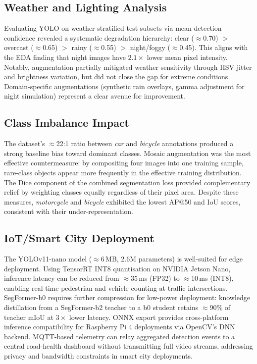 \documentclass[10pt,twocolumn]{article}
\begin{document}
\subsection{Weather and Lighting Analysis}

Evaluating YOLO on weather-stratified test subsets via mean detection
confidence revealed a systematic degradation hierarchy:
clear ($\approx$0.70) $>$ overcast ($\approx$0.65) $>$ rainy ($\approx$0.55)
$>$ night/foggy ($\approx$0.45).  This aligns with the EDA finding that night
images have $2.1\times$ lower mean pixel intensity.  Notably, augmentation
partially mitigated weather sensitivity through HSV jitter and brightness
variation, but did not close the gap for extreme conditions.  Domain-specific
augmentations (synthetic rain overlays, gamma adjustment for night simulation)
represent a clear avenue for improvement.

\subsection{Class Imbalance Impact}

The dataset's $\approx$22:1 ratio between \textit{car} and \textit{bicycle}
annotations produced a strong baseline bias toward dominant classes.
Mosaic augmentation was the most effective countermeasure: by compositing four
images into one training sample, rare-class objects appear more frequently in
the effective training distribution.  The Dice component of the combined
segmentation loss provided complementary relief by weighting classes equally
regardless of their pixel area.  Despite these measures, \textit{motorcycle}
and \textit{bicycle} exhibited the lowest AP@50 and IoU scores, consistent with
their under-representation.

\subsection{IoT/Smart City Deployment}

The YOLOv11-nano model ($\approx$6\,MB, 2.6M parameters) is well-suited for
edge deployment.  Using TensorRT INT8 quantisation on NVIDIA Jetson Nano,
inference latency can be reduced from $\approx$35\,ms (FP32) to $\approx$10\,ms
(INT8), enabling real-time pedestrian and vehicle counting at traffic
intersections.  SegFormer-b0 requires further compression for low-power
deployment: knowledge distillation from a SegFormer-b2 teacher to a b0 student
retains $\approx$90\% of teacher mIoU at $3\times$ lower latency.
ONNX export provides cross-platform inference compatibility for Raspberry Pi 4
deployments via OpenCV's DNN backend.  MQTT-based telemetry can relay
aggregated detection events to a central road-health dashboard without
transmitting full video streams, addressing privacy and bandwidth constraints
in smart city deployments.
\end{document}
